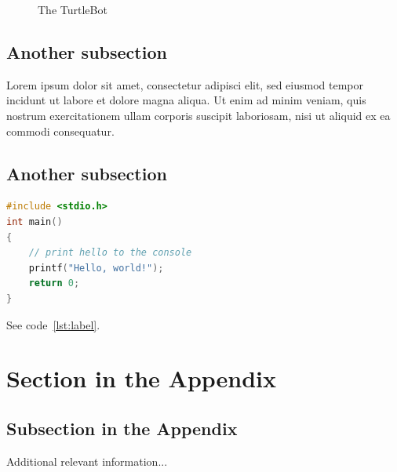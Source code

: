\documentclass[english]{article}
\begin{document}
\begin{figure}[!ht]
	\centering
	\caption{The TurtleBot}
\end{figure}

\subsection{Another subsection}

Lorem ipsum dolor sit amet, consectetur adipisci elit, sed eiusmod tempor incidunt ut labore et dolore magna aliqua. Ut enim ad minim veniam, quis nostrum exercitationem ullam corporis suscipit laboriosam, nisi ut aliquid ex ea commodi consequatur.

\subsection{Another subsection}

\begin{lstlisting}[language=C, caption={C code using listings}, label={lst:label} ]
#include <stdio.h>
int main()
{
	// print hello to the console
	printf("Hello, world!");
	return 0;
}
\end{lstlisting}

See code~\ref{lst:label}.




\clearpage
\appendix

\section{Section in the Appendix}
\label{sec:app1}

\subsection{Subsection in the Appendix}
\label{subsec:app2}

Additional relevant information...
\end{document}
